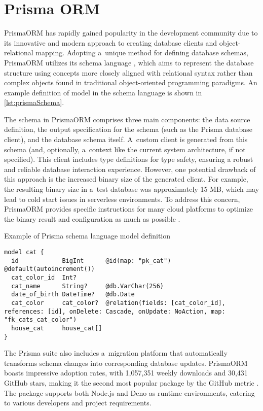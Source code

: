 \section{Prisma ORM}

PrismaORM has rapidly gained popularity in the development community due to its
innovative and modern approach to creating database clients and
object-relational mapping. Adopting a~unique method for defining database
schemas, PrismaORM utilizes its schema language \cite{prismaDocsSchema}, which
aims to represent the database structure using concepts more closely aligned
with relational syntax rather than complex objects found in traditional
object-oriented programming paradigms. An example definition of model in the
schema language is shown in \autoref{lst:prismaSchema}.

The schema in PrismaORM comprises three main components: the data source
definition, the output specification for the schema (such as the Prisma database
client), and the database schema itself. A~custom client is generated from this
schema (and, optionally, a~context like the current system architecture, if not
specified). This client includes type definitions for type safety, ensuring a
robust and reliable database interaction experience. However, one potential
drawback of this approach is the increased binary size of the generated client.
For example, the resulting binary size in a~test database was approximately 15
MB, which may lead to cold start issues in serverless environments. To address
this concern, PrismaORM provides specific instructions for many cloud platforms
to optimize the binary result and configuration as much as possible
\cite{prismaDocsDeploy}.

\begin{listing}
\caption{Example of Prisma schema language model definition}
\label{lst:prismaSchema}
    \begin{verbatim}
model cat {
  id            BigInt      @id(map: "pk_cat") @default(autoincrement())
  cat_color_id  Int?
  cat_name      String?     @db.VarChar(256)
  date_of_birth DateTime?   @db.Date
  cat_color     cat_color?  @relation(fields: [cat_color_id], references: [id], onDelete: Cascade, onUpdate: NoAction, map: "fk_cats_cat_color")
  house_cat     house_cat[]
}
    \end{verbatim}
\end{listing}

The Prisma suite also includes a~migration platform that automatically
transforms schema changes into corresponding database updates. PrismaORM boasts
impressive adoption rates, with 1,057,351 weekly downloads and 30,431 GitHub
stars, making it the second most popular package by the GitHub metric
\cite{prismaNpm} \cite{prismaGitHub}. The package supports both Node.js and Deno
as runtime environments, catering to various developers and project
requirements.

